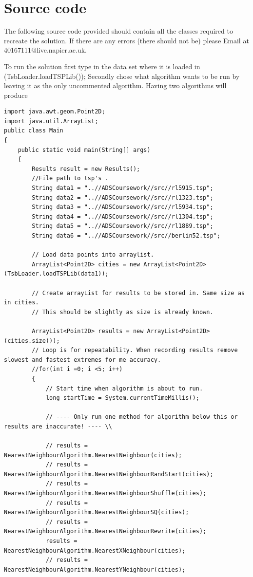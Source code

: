 \documentclass[conference,backref=page]{acmsiggraph}
\begin{document}
\section{Source code}
 The following source code provided should contain all the classes required to recreate the solution. If there are any errors (there should not be) please Email at 40167111@live.napier.ac.uk.
 
 To run the solution first type in the data set where it is loaded in (TsbLoader.loadTSPLib());
 Secondly chose what algorithm wants to be run by leaving it as the only uncommented algorithm. Having two algorithms will produce 
\onecolumn
\begin{verbatim}
import java.awt.geom.Point2D;
import java.util.ArrayList;
public class Main
{
	public static void main(String[] args)
	{
		Results result = new Results();		
		//File path to tsp's . 
		String data1 = "..//ADSCoursework//src//rl5915.tsp";
		String data2 = "..//ADSCoursework//src//rl1323.tsp";
		String data3 = "..//ADSCoursework//src//rl5934.tsp";
		String data4 = "..//ADSCoursework//src//rl1304.tsp";
		String data5 = "..//ADSCoursework//src//rl1889.tsp";
		String data6 = "..//ADSCoursework//src//berlin52.tsp";
		
		// Load data points into arraylist.
		ArrayList<Point2D> cities = new ArrayList<Point2D>(TsbLoader.loadTSPLib(data1));
		
		// Create arrayList for results to be stored in. Same size as in cities.
		// This should be slightly as size is already known.
		
		ArrayList<Point2D> results = new ArrayList<Point2D>(cities.size());
		// Loop is for repeatability. When recording results remove slowest and fastest extremes for me accuracy.
		//for(int i =0; i <5; i++)
		{
			// Start time when algorithm is about to run.
			long startTime = System.currentTimeMillis();
			
			// ---- Only run one method for algorithm below this or results are inaccurate! ---- \\
			
			// results = NearestNeighbourAlgorithm.NearestNeighbour(cities);
			// results = NearestNeighbourAlgorithm.NearestNeighbourRandStart(cities);
			// results = NearestNeighbourAlgorithm.NearestNeighbourShuffle(cities);
			// results = NearestNeighbourAlgorithm.NearestNeighbourSQ(cities);
			// results = NearestNeighbourAlgorithm.NearestNeighbourRewrite(cities);
			results = NearestNeighbourAlgorithm.NearestXNeighbour(cities);
			// results = NearestNeighbourAlgorithm.NearestYNeighbour(cities);
			

\end{verbatim}
\end{document}
